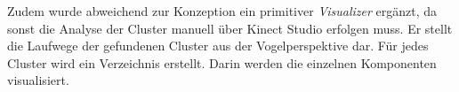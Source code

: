 Zudem wurde abweichend zur Konzeption ein primitiver \emph{Visualizer} ergänzt,
da sonst die Analyse der Cluster manuell über Kinect Studio erfolgen muss.
Er stellt die Laufwege der gefundenen Cluster aus der Vogelperspektive dar.
Für jedes Cluster wird ein Verzeichnis erstellt.
Darin werden die einzelnen Komponenten visualisiert.